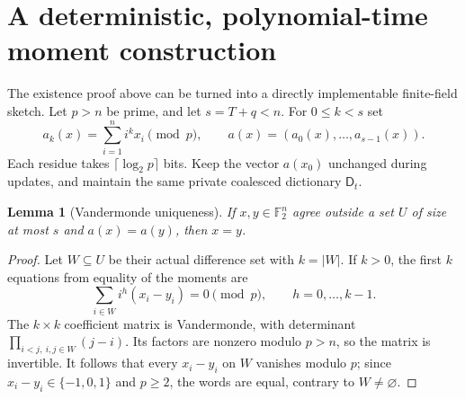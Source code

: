 \documentclass[11pt,a4paper]{article}
\newtheorem{lemma}[theorem]{Lemma}
\newcommand{\F}{\mathbb F_2}
\newcommand{\Dic}{\mathsf D}
\begin{document}
\section{A deterministic, polynomial-time moment construction}\label{sec:moments}
The existence proof above can be turned into a directly implementable finite-field sketch. Let $p>n$ be prime, and let $s=T+q<n$. For $0\le k<s$ set
\begin{equation}\label{eq:moments}
 a_k(x)=\sum_{i=1}^n i^k x_i\pmod p,
 \qquad a(x)=(a_0(x),\ldots,a_{s-1}(x)).
\end{equation}
Each residue takes $\lceil\log_2p\rceil$ bits. Keep the vector $a(x_0)$ unchanged during updates, and maintain the same private coalesced dictionary $\Dic_t$.

\begin{lemma}[Vandermonde uniqueness]\label{lem:vander}
If $x,y\in\F^n$ agree outside a set $U$ of size at most $s$ and $a(x)=a(y)$, then $x=y$.
\end{lemma}
\begin{proof}
Let $W\subseteq U$ be their actual difference set with $k=|W|$. If $k>0$, the first $k$ equations from equality of the moments are
\[
\sum_{i\in W}i^h(x_i-y_i)=0\pmod p,\qquad h=0,\ldots,k-1.
\]
The $k\times k$ coefficient matrix is Vandermonde, with determinant $\prod_{i<j,\ i,j\in W}(j-i)$. Its factors are nonzero modulo $p>n$, so the matrix is invertible. It follows that every $x_i-y_i$ on $W$ vanishes modulo $p$; since $x_i-y_i\in\{-1,0,1\}$ and $p\ge2$, the words are equal, contrary to $W\ne\varnothing$.
\end{proof}
\end{document}
